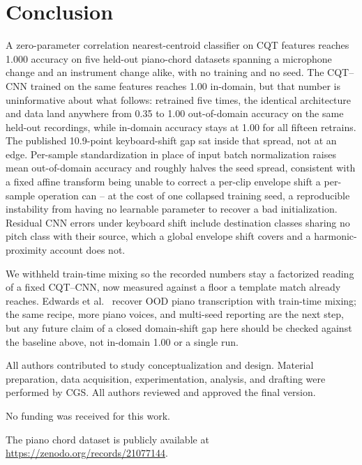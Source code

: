 \documentclass[pdflatex,sn-mathphys-num,iicol]{sn-jnl}
\theoremstyle{thmstyleone}
\theoremstyle{thmstyletwo}
\theoremstyle{thmstylethree}
\begin{document}
\section{Conclusion}\label{sec6}

A zero-parameter correlation nearest-centroid classifier on CQT features reaches 1.000 accuracy on five held-out piano-chord datasets spanning a microphone change and an instrument change alike, with no training and no seed. The CQT--CNN trained on the same features reaches 1.00 in-domain, but that number is uninformative about what follows: retrained five times, the identical architecture and data land anywhere from 0.35 to 1.00 out-of-domain accuracy on the same held-out recordings, while in-domain accuracy stays at 1.00 for all fifteen retrains. The published 10.9-point keyboard-shift gap sat inside that spread, not at an edge. Per-sample standardization in place of input batch normalization raises mean out-of-domain accuracy and roughly halves the seed spread, consistent with a fixed affine transform being unable to correct a per-clip envelope shift a per-sample operation can -- at the cost of one collapsed training seed, a reproducible instability from having no learnable parameter to recover a bad initialization. Residual CNN errors under keyboard shift include destination classes sharing no pitch class with their source, which a global envelope shift covers and a harmonic-proximity account does not.

We withheld train-time mixing so the recorded numbers stay a factorized reading of a fixed CQT--CNN, now measured against a floor a template match already reaches. Edwards et al.\ \cite{Edwards2024} recover OOD piano transcription with train-time mixing; the same recipe, more piano voices, and multi-seed reporting are the next step, but any future claim of a closed domain-shift gap here should be checked against the baseline above, not in-domain 1.00 or a single run.

\backmatter

All authors contributed to study conceptualization and design. Material preparation, data acquisition, experimentation, analysis, and drafting were performed by CGS. All authors reviewed and approved the final version.

No funding was received for this work.

The piano chord dataset is publicly available at \url{https://zenodo.org/records/21077144}.
\end{document}
